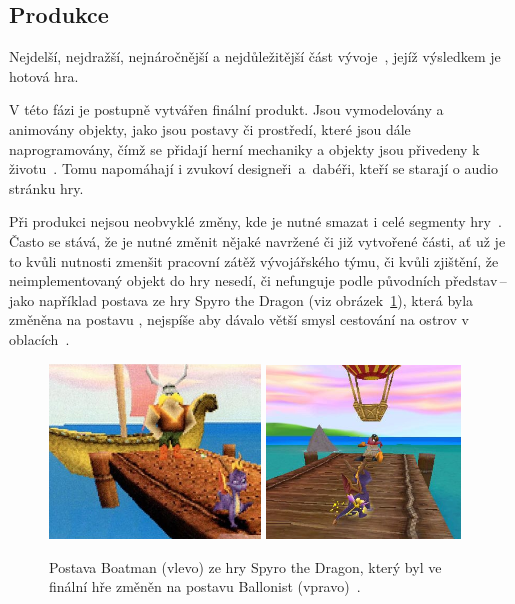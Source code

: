 \subsection*{Produkce}
Nejdelší, nejdražší, nejnáročnější a nejdůležitější část vývoje~\cite{g2_game_development}, jejíž výsledkem je hotová hra. 

V této fázi je postupně vytvářen finální produkt. Jsou vymodelovány a animovány objekty, jako jsou postavy či prostředí, které jsou dále naprogramovány, čímž se přidají herní mechaniky a objekty jsou přivedeny k životu~\cite{GameMaker_development}. Tomu napomáhají i zvukoví designeři~a~dabéři, kteří se starají o audio stránku hry.

Při produkci nejsou neobvyklé změny, kde je nutné smazat i celé segmenty hry~\cite{g2_game_development}. Často se stává, že je nutné změnit nějaké navržené či již vytvořené části, ať už je to kvůli nutnosti zmenšit pracovní zátěž vývojářského týmu, či kvůli zjištění, že neimplementovaný objekt do hry nesedí, či nefunguje podle původních představ\,--\,jako například postava  ze hry Spyro the Dragon (viz obrázek~\ref{fig:spyro_cut}), která byla změněna na postavu , nejspíše aby dávalo větší smysl cestování na ostrov v oblacích~\cite{GameMaker_development}.

\begin{figure}[hb]
    \vspace{0.5cm}
    \centering
    \includegraphics[width=0.5\textwidth]{obrazky-figures/ch2/Spyro-Boatman.png}\hspace{0.1cm}
    \includegraphics[width=0.46\textwidth]{obrazky-figures/ch2/Spyro-Ballonist.png}
    \caption{Postava Boatman (vlevo) ze hry Spyro the Dragon, který byl ve finální hře změněn na postavu Ballonist (vpravo)~\cite{GameMaker_development}.}
    \label{fig:spyro_cut}
\end{figure}

